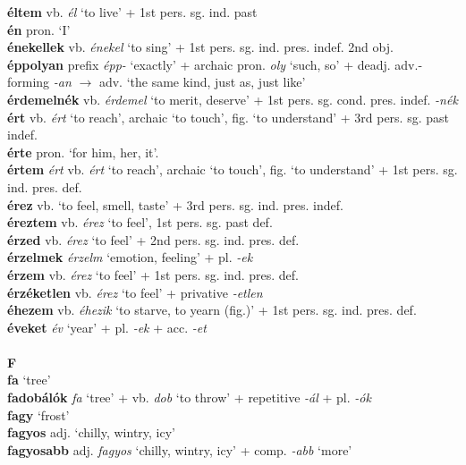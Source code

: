 \documentclass[11pt]{article}
\begin{document}
\textbf{éltem} vb. \emph{él} `to live' + 1st pers. sg. ind. past \\
\textbf{én} pron. `I' \\
\textbf{énekellek} vb. \emph{énekel} `to sing' + 1st
pers. sg. ind. pres. indef. 2nd obj. \\
\textbf{éppolyan} prefix \emph{épp-} `exactly' + archaic pron. \emph{oly}
`such, so' + deadj. adv.\hyp{}forming \emph{-an} $\rightarrow$ adv. `the
same kind, just as, just like' \\
\textbf{érdemelnék} vb. \emph{érdemel} `to merit, deserve' + 1st
pers. sg. cond. pres. indef. \emph{-nék} \\
\textbf{ért} vb. \emph{ért} `to reach', archaic `to touch', fig. `to
understand' + 3rd pers. sg. past indef. \\
\textbf{érte} pron. `for him, her, it'. \\
\textbf{értem} \emph{ért} vb. \emph{ért} `to reach', archaic `to touch',
fig. `to understand' + 1st pers. sg. ind. pres. def. \\
\textbf{érez} vb. `to feel, smell, taste' + 3rd
pers. sg. ind. pres. indef. \\
\textbf{éreztem} vb. \emph{érez} `to feel', 1st pers. sg. past def. \\
\textbf{érzed} vb. \emph{érez} `to feel' + 2nd
pers. sg. ind. pres. def. \\
\textbf{érzelmek} \emph{érzelm} `emotion, feeling' + pl. \emph{-ek} \\
\textbf{érzem} vb. \emph{érez} `to feel' + 1st
pers. sg. ind. pres. def. \\
\textbf{érzéketlen} vb. \emph{érez} `to feel' +
privative \emph{-etlen} \\
\textbf{éhezem} vb. \emph{éhezik} `to starve, to yearn (fig.)' + 1st
pers. sg. ind. pres. def. \\
\textbf{éveket} \emph{év} `year' + pl. \emph{-ek} + acc. \emph{-et} \\
\ \\
\noindent \textbf{\large F} \\
\textbf{fa} `tree' \\
\textbf{fadobálók} \emph{fa} `tree' + vb. \emph{dob} `to throw' +
repetitive \emph{-ál} + pl. \emph{-ók} \\
\textbf{fagy} `frost' \\
\textbf{fagyos} adj. `chilly, wintry, icy' \\
\textbf{fagyosabb} adj. \emph{fagyos} `chilly, wintry, icy' +
comp. \emph{-abb} `more' \\
\end{document}
